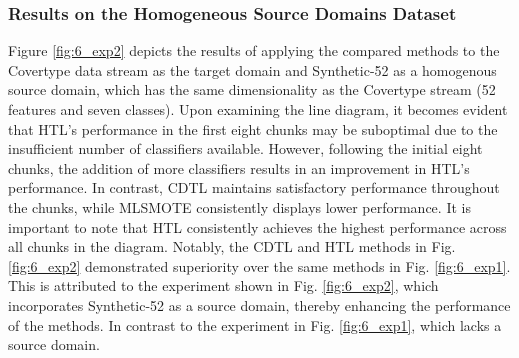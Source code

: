 \subsubsection{Results on the Homogeneous Source Domains Dataset}
Figure \ref{fig:6_exp2} depicts the results of applying the compared methods to the Covertype data stream as the target domain and Synthetic-52 as a homogenous source domain, which has the same dimensionality as the Covertype stream (52 features and seven classes). Upon examining the line diagram, it becomes evident that HTL's performance in the first eight chunks may be suboptimal due to the insufficient number of classifiers available. However, following the initial eight chunks, the addition of more classifiers results in an improvement in HTL's performance. In contrast, CDTL maintains satisfactory performance throughout the chunks, while MLSMOTE consistently displays lower performance. It is important to note that HTL consistently achieves the highest performance across all chunks in the diagram. Notably, the CDTL and HTL methods in Fig. \ref{fig:6_exp2} demonstrated superiority over the same methods in Fig. \ref{fig:6_exp1}. This is attributed to the experiment shown in Fig. \ref{fig:6_exp2}, which incorporates Synthetic-52 as a source domain, thereby enhancing the performance of the methods. In contrast to the experiment in Fig. \ref{fig:6_exp1}, which lacks a source domain.

